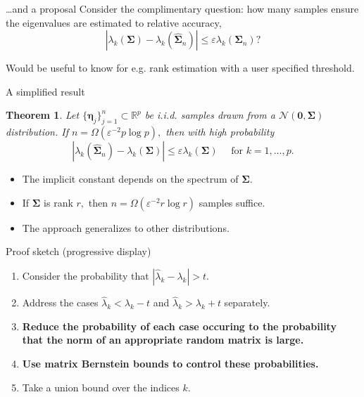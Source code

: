 \documentclass[pdf,mpa]{prosper}
\newcommand{\mat}[1]{\ensuremath{\mathbf{#1}}}
\renewcommand{\R}{\ensuremath{\mathbb{R}}}
\newtheorem{thm}{Theorem}
\begin{document}
\begin{slide}{\dots and a proposal}
Consider the complimentary question:
how many samples ensure the eigenvalues are estimated to relative accuracy,
\[
|\lambda_k(\mat{\Sigma}) - \lambda_k(\widehat{\mat{\Sigma}}_n)| \leq \varepsilon \lambda_k(\mat{\Sigma}_n)?
\]

Would be useful to know for e.g. rank estimation with a user specified threshold.
\end{slide}

\begin{slide}{A simplified result}

\begin{thm}
Let $\{\mat{\eta}_j\}_{j=1}^n \subset \R^p$ be i.i.d. samples drawn from a $\mathcal{N}(\mat{0}, \mat{\Sigma})$ distribution. 
If $n = \Omega(\varepsilon^{-2} p \log p),$ then with high probability
\[
|\lambda_k(\widehat{\mat{\Sigma}}_n) - \lambda_k(\mat{\Sigma})| \leq \varepsilon \lambda_k(\mat{\Sigma}) \quad \text{ for } k=1,\ldots,p.
\]
\end{thm}

\begin{itemize}
	\item The implicit constant depends on the spectrum of $\mat{\Sigma}.$
	\item If $\mat{\Sigma}$ is rank $r,$ then $n= \Omega(\varepsilon^{-2} r \log r)$ samples suffice.
	\item The approach generalizes to other distributions.
\end{itemize}
\end{slide}

\begin{slide}{Proof sketch}
(progressive display)
\begin{enumerate}
	\item Consider the probability that $|\hat{\lambda}_k - \lambda_k| > t.$

	\item Address the cases $\hat{\lambda}_k < \lambda_k -t $ and $\hat{\lambda}_k > \lambda_k + t$ separately. 

	\item {\bf Reduce the probability of each case occuring to the probability that the norm of an appropriate random matrix is large.}

	\item {\bf Use matrix Bernstein bounds to control these probabilities. }

	\item Take a union bound over the indices $k.$
 \end{enumerate}
 
\end{slide}
\end{document}
